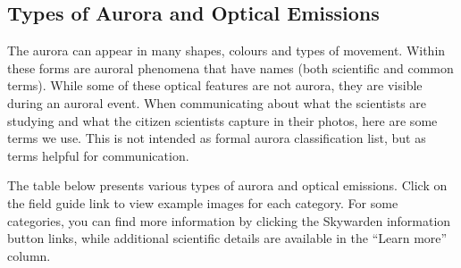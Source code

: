\documentclass{article}
\newcommand{\contributed}[1]{%
    \par\noindent
    \begingroup
    \setlength{\leftskip}{1em}%
    \itshape
    Contributors: #1
    \par
    \endgroup
    \vspace{0.5em}
}
\begin{document}
\subsection{Types of Aurora and Optical Emissions}
\label{types-of-aurora-and-optical-emissions}

The aurora can appear in many shapes, colours and types of movement.  Within these forms are auroral phenomena that have names (both scientific and common terms). While some of these optical features are not aurora, they are visible during an auroral event. When communicating about what the scientists are studying and what the citizen scientists capture in their photos, here are some terms we use. This is not intended as formal aurora classification list, but as terms helpful for communication.

The table below presents various types of aurora and optical emissions. Click on the field guide link to view example images for each category. For some categories, you can find more information by clicking the Skywarden information button links, while additional scientific details are available in the ``Learn more'' column.
\end{document}
